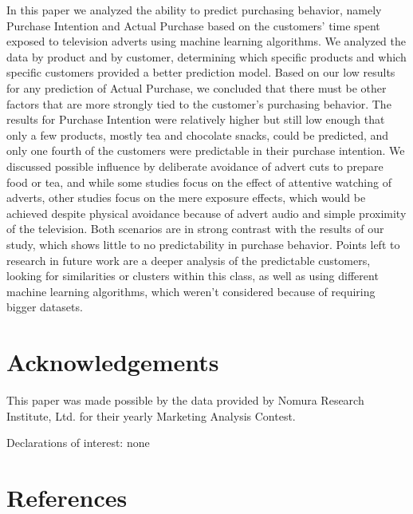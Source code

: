 \documentclass[review]{elsarticle}
\begin{document}
In this paper we analyzed the ability to predict purchasing behavior, namely Purchase Intention and Actual Purchase based on the customers' time spent exposed to television adverts using machine learning algorithms. We analyzed the data by product and by customer, determining which specific products and which specific customers provided a better prediction model. Based on our low results for any prediction of Actual Purchase, we concluded that there must be other factors that are more strongly tied to the customer's purchasing behavior. The results for Purchase Intention were relatively higher but still low enough that only a few products, mostly tea and chocolate snacks, could be predicted, and only one fourth of the customers were predictable in their purchase intention. We discussed possible influence by deliberate avoidance of advert cuts to prepare food or tea, and while some studies focus on the effect of attentive watching of adverts, other studies focus on the mere exposure effects, which would be achieved despite physical avoidance because of advert audio and simple proximity of the television. Both scenarios are in strong contrast with the results of our study, which shows little to no predictability in purchase behavior. Points left to research in future work are a deeper analysis of the predictable customers, looking for similarities or clusters within this class, as well as using different machine learning algorithms, which weren't considered because of requiring bigger datasets. 

\section{Acknowledgements}

This paper was made possible by the data provided by Nomura Research Institute, Ltd. for their yearly Marketing Analysis Contest.

Declarations of interest: none

\section*{References}


\end{document}

